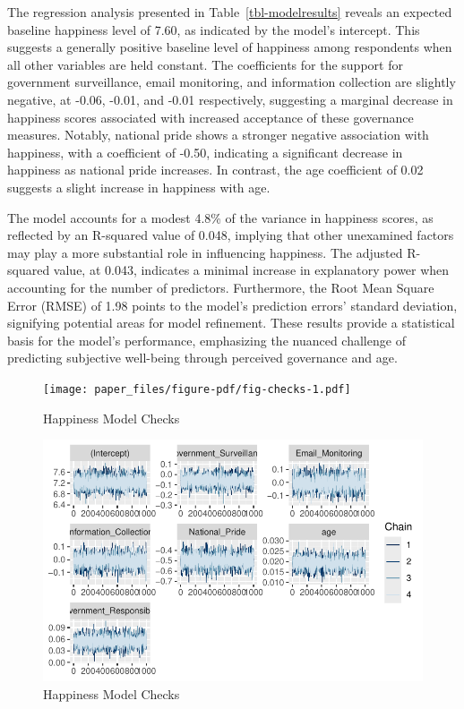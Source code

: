 \documentclass[
  letterpaper,
  DIV=11,
  numbers=noendperiod]{scrartcl}
\begin{document}
The regression analysis presented in Table~\ref{tbl-modelresults}
reveals an expected baseline happiness level of 7.60, as indicated by
the model's intercept. This suggests a generally positive baseline level
of happiness among respondents when all other variables are held
constant. The coefficients for the support for government surveillance,
email monitoring, and information collection are slightly negative, at
-0.06, -0.01, and -0.01 respectively, suggesting a marginal decrease in
happiness scores associated with increased acceptance of these
governance measures. Notably, national pride shows a stronger negative
association with happiness, with a coefficient of -0.50, indicating a
significant decrease in happiness as national pride increases. In
contrast, the age coefficient of 0.02 suggests a slight increase in
happiness with age.

The model accounts for a modest 4.8\% of the variance in happiness
scores, as reflected by an R-squared value of 0.048, implying that other
unexamined factors may play a more substantial role in influencing
happiness. The adjusted R-squared value, at 0.043, indicates a minimal
increase in explanatory power when accounting for the number of
predictors. Furthermore, the Root Mean Square Error (RMSE) of 1.98
points to the model's prediction errors' standard deviation, signifying
potential areas for model refinement. These results provide a
statistical basis for the model's performance, emphasizing the nuanced
challenge of predicting subjective well-being through perceived
governance and age.

\begin{figure}

{\centering \texttt{[image: paper\_files/figure-pdf/fig-checks-1.pdf]}

}

\caption{\label{fig-checks-1}Happiness Model Checks}

\end{figure}

\begin{figure}

{\centering \includegraphics{paper_files/figure-pdf/fig-checks-2.pdf}

}

\caption{\label{fig-checks-2}Happiness Model Checks}

\end{figure}
\end{document}
